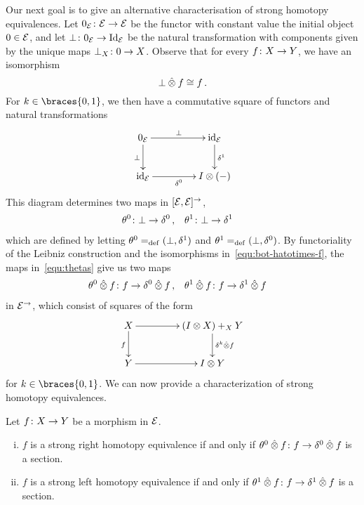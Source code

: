 \documentclass[reqno,10pt,a4paper,oneside,draft]{amsart}
\begin{document}
Our next goal is to give an alternative characterisation of strong homotopy equivalences.
Let $0_{\mathcal{E}} \colon \mathcal{E} \to \mathcal{E}$ be the functor with constant value the initial object $0 \in \mathcal{E}$, and let $\bot \colon 0_{\mathcal{E}} \rightarrow \operatorname{Id}_{\mathcal{E}}$ be the natural transformation with components given by the unique maps $\bot_X \colon 0 \to X$.
Observe that for every $f \colon X \to Y$, we have an isomorphism
\begin{equation}
\label{equ:bot-hatotimes-f}
\bot \mathbin{\hat{\otimes}} f \cong f \, .
\end{equation}
For $k \in \braces{0, 1}$, we then have a commutative square of functors and natural transformations
\[
\xymatrix@C+2em{
  0_\catE \ar[r]^{\bot} \ar[d]_{\bot} & \id_\catE \ar[d]^{\rcyl} \\
  \id_\catE \ar[r]_{\lcyl} & \interval \otimes (-)
}
\]
This diagram determines two maps in $[\mathcal{E}, \mathcal{E}]^\to$,
\begin{equation} \label{equ:thetas}
\begin{aligned}
  \theta^{0} &\colon \bot \rightarrow \delta^0
\, ,&
  \theta^{1} &\colon \bot \rightarrow \delta^1
\end{aligned}
\end{equation}
which are defined by letting $\theta^{0} =_{\operatorname{def}} (\bot, \delta^1)$ and $\theta^{1} =_{\operatorname{def}} (\bot, \delta^0)$.
By functoriality of the Leibniz construction and the isomorphisms in~\eqref{equ:bot-hatotimes-f}, the maps in~\eqref{equ:thetas} give us two maps
\begin{equation*}
\begin{aligned}
  \theta^{0} \mathbin{\hat{\otimes}} f &\colon f \to \delta^0 \mathbin{\hat{\otimes}} f
\, ,&
  \theta^{1} \mathbin{\hat{\otimes}} f &\colon f \to \delta^1 \mathbin{\hat{\otimes}} f
\end{aligned}
\end{equation*}
in $\mathcal{E}^\to$, which consist of squares of the form
\[
\xymatrix@C+2em{
  X \ar[r] \ar[d]_{f} & (\interval \otimes X) +_{X} Y \ar[d]^{\kcyl \hatotimes f} \\
  Y \ar[r] & \interval \otimes Y
}
\]
for $k \in \braces{0, 1}$.
We can now provide a characterization of strong homotopy equivalences.

\begin{proposition} \label{strong-h-equiv-as-section}
Let $f \colon X \to Y$ be a morphism in $\mathcal{E}$.
\begin{enumerate}[(i)]
\item $f$ is a strong right homotopy equivalence if and only if $\theta^{0} \mathbin{\hat{\otimes}} f \colon f \rightarrow \delta^0 \mathbin{\hat{\otimes}} f$ is a section.
\item $f$ is a strong left homotopy equivalence if and only if $\theta^{1} \mathbin{\hat{\otimes}} f \colon f \rightarrow \delta^1 \mathbin{\hat{\otimes}} f$ is a section.
\end{enumerate}
\end{proposition}
\end{document}
